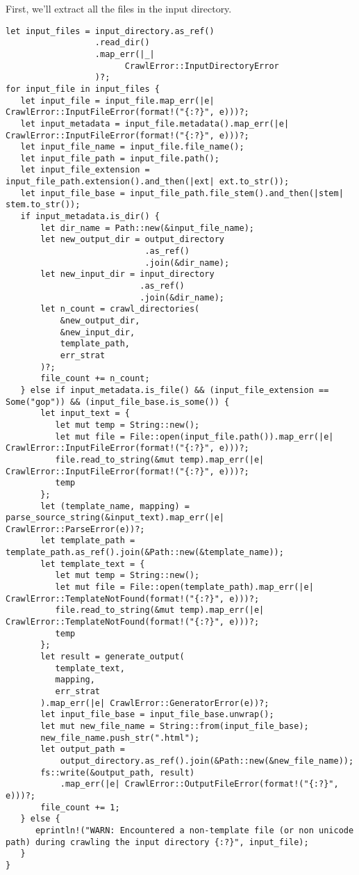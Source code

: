 \documentclass[11pt]{article}
\begin{document}
First, we'll extract all the files in the input directory.
\begin{verbatim}
let input_files = input_directory.as_ref()
                  .read_dir()
                  .map_err(|_| 
                        CrawlError::InputDirectoryError
                  )?;
for input_file in input_files {
   let input_file = input_file.map_err(|e| CrawlError::InputFileError(format!("{:?}", e)))?;
   let input_metadata = input_file.metadata().map_err(|e| CrawlError::InputFileError(format!("{:?}", e)))?;
   let input_file_name = input_file.file_name();
   let input_file_path = input_file.path();
   let input_file_extension = input_file_path.extension().and_then(|ext| ext.to_str());
   let input_file_base = input_file_path.file_stem().and_then(|stem| stem.to_str());
   if input_metadata.is_dir() {
       let dir_name = Path::new(&input_file_name);
       let new_output_dir = output_directory
                            .as_ref()
                            .join(&dir_name);
       let new_input_dir = input_directory
                           .as_ref()
                           .join(&dir_name);
       let n_count = crawl_directories(
           &new_output_dir, 
           &new_input_dir, 
           template_path, 
           err_strat
       )?;
       file_count += n_count;
   } else if input_metadata.is_file() && (input_file_extension == Some("gop")) && (input_file_base.is_some()) {
       let input_text = {
          let mut temp = String::new();
          let mut file = File::open(input_file.path()).map_err(|e| CrawlError::InputFileError(format!("{:?}", e)))?;
          file.read_to_string(&mut temp).map_err(|e| CrawlError::InputFileError(format!("{:?}", e)))?;
          temp
       };
       let (template_name, mapping) = parse_source_string(&input_text).map_err(|e| CrawlError::ParseError(e))?;
       let template_path = template_path.as_ref().join(&Path::new(&template_name));
       let template_text = {
          let mut temp = String::new();
          let mut file = File::open(template_path).map_err(|e| CrawlError::TemplateNotFound(format!("{:?}", e)))?;
          file.read_to_string(&mut temp).map_err(|e| CrawlError::TemplateNotFound(format!("{:?}", e)))?;
          temp
       };
       let result = generate_output(
          template_text, 
          mapping, 
          err_strat
       ).map_err(|e| CrawlError::GeneratorError(e))?;
       let input_file_base = input_file_base.unwrap();
       let mut new_file_name = String::from(input_file_base);
       new_file_name.push_str(".html");
       let output_path = 
           output_directory.as_ref().join(&Path::new(&new_file_name));
       fs::write(&output_path, result)
           .map_err(|e| CrawlError::OutputFileError(format!("{:?}", e)))?;
       file_count += 1;
   } else {
      eprintln!("WARN: Encountered a non-template file (or non unicode path) during crawling the input directory {:?}", input_file);
   }
}
\end{verbatim}
\end{document}
